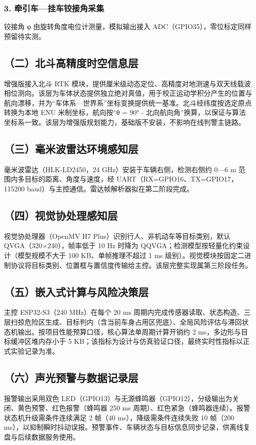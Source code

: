 \documentclass[UTF8,11pt]{ctexart}
\begin{document}
\subsubsection*{3. 牵引车—挂车铰接角采集}
铰接角 φ 由旋转角度电位计测量，模拟输出接入 ADC（GPIO35），零位标定同样预留待实测。

\subsection*{（二）北斗高精度时空信息层}
增强版接入北斗 RTK 模块，提供厘米级动态定位、高精度对地测速与双天线载波相位测向。该层为车体状态提供独立绝对真值，用于校正运动学积分产生的位置与航向漂移，并为“车体系—世界系”坐标变换提供统一基准。北斗经纬度按选定原点转换为本地 ENU 米制坐标，航向按“θ = 90° - 北向航向角”换算，以保证与算法坐标系一致。该层为增强版规划能力，基础版不安装，不影响在线判警主链路。

\subsection*{（三）毫米波雷达环境感知层}
毫米波雷达（HLK-LD2450，24 GHz）安装于车辆右侧，检测右侧约 0—6 m 范围内多目标的距离、角度与速度，经 UART（RX=GPIO16、TX=GPIO17，115200 baud）与主控通信。雷达帧解析器拟在第二阶段完成。

\subsection*{（四）视觉协处理感知层}
视觉协处理器（OpenMV H7 Plus）识别行人、非机动车等目标类别，默认 QVGA（320$\times$240），帧率低于 10 Hz 时降为 QQVGA；检测模型按轻量化约束设计（模型规模不大于 100 KB、单帧推理不超过 1 ms 级别）。视觉模块按固定二进制协议将目标类别、位置框与置信度传输给主控。该层完整实现属第三阶段任务。

\subsection*{（五）嵌入式计算与风险决策层}
主控 ESP32-S3（240 MHz）在每个 20 ms 周期内完成传感器读取、状态构造、三层扫掠危险区生成、目标判内（含当前车身占用区兜底）、全局风险评估与滞回状态机输出。按项目性能预算口径，核心算法单周期计算开销约 2 ms，多边形与目标缓冲区堆内存小于 5 KB；该指标为设计与仿真验证口径，最终实时性指标以正式实验记录为准。

\subsection*{（六）声光预警与数据记录层}
报警输出采用双色 LED（GPIO13）与无源蜂鸣器（GPIO12），分级输出为关闭、黄色预警、红色报警（蜂鸣器 250 ms 周期）、红色紧急（蜂鸣器连续）。报警状态机升级需条件连续满足 2 帧（40 ms），降级需条件连续失败 10 帧（200 ms），以抑制瞬时抖动误报。预警事件、车辆状态与目标信息同步记录，供离线复盘与后续数据服务使用。
\end{document}
